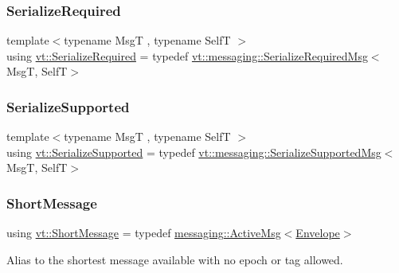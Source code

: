 \subsubsection{\texorpdfstring{Serialize\+Required}{SerializeRequired}}
{\footnotesize\ttfamily template$<$typename MsgT , typename SelfT $>$ \\
using \hyperlink{namespacevt_a9e60e2e8929828639383ac1d6643384d}{vt\+::\+Serialize\+Required} = typedef \hyperlink{structvt_1_1messaging_1_1_serialize_required_msg}{vt\+::messaging\+::\+Serialize\+Required\+Msg}$<$MsgT, SelfT$>$}

\mbox{\label{namespacevt_a3862b8e3f67ab03f3a4313d828592fa9}} 
\subsubsection{\texorpdfstring{Serialize\+Supported}{SerializeSupported}}
{\footnotesize\ttfamily template$<$typename MsgT , typename SelfT $>$ \\
using \hyperlink{namespacevt_a3862b8e3f67ab03f3a4313d828592fa9}{vt\+::\+Serialize\+Supported} = typedef \hyperlink{structvt_1_1messaging_1_1_serialize_supported_msg}{vt\+::messaging\+::\+Serialize\+Supported\+Msg}$<$MsgT, SelfT$>$}

\mbox{\label{namespacevt_a1125ac1da6c0bbf141e0ea0739d7602d}} 
\subsubsection{\texorpdfstring{Short\+Message}{ShortMessage}}
{\footnotesize\ttfamily using \hyperlink{namespacevt_a1125ac1da6c0bbf141e0ea0739d7602d}{vt\+::\+Short\+Message} = typedef \hyperlink{structvt_1_1messaging_1_1_active_msg}{messaging\+::\+Active\+Msg}$<$\hyperlink{namespacevt_aa9c8cc094b5361482021d63012987814}{Envelope}$>$}



Alias to the shortest message available with no epoch or tag allowed. 

\mbox{\label{namespacevt_ae78cbfdf1e57470e33eedb074f2beeba}} 
